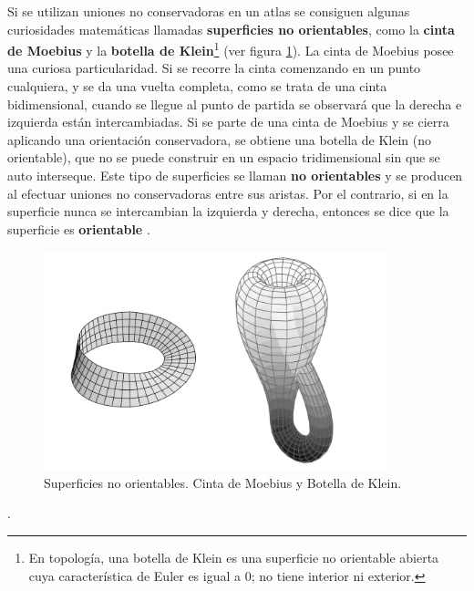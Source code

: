 \vspace{5mm}
Si se utilizan uniones no conservadoras en un atlas se consiguen algunas curiosidades matemáticas llamadas \textbf{superficies no orientables}, como la \textbf{cinta de Moebius} y la \textbf{botella de Klein}\footnote{En topología, una botella de Klein es una superficie no orientable abierta cuya característica de Euler es igual a $0$; no tiene interior ni exterior.} (ver figura \ref{fig:atlas2}). La cinta de Moebius posee una curiosa particularidad. Si se recorre la cinta comenzando en un punto cualquiera, y se da una vuelta completa, como se trata de una cinta bidimensional, cuando se llegue al punto de partida se observará que la derecha e izquierda están intercambiadas. 
Si se parte de una cinta de Moebius y se cierra aplicando una orientación conservadora, se obtiene una botella de Klein (no orientable), que no se puede construir en un espacio tridimensional sin que se auto interseque.
Este tipo de superficies se llaman \textbf{no orientables} y se producen al efectuar uniones no conservadoras entre sus aristas. Por el contrario, si en la superficie nunca se intercambian la izquierda y derecha, entonces se dice que la superficie es \textbf{orientable} \citep{Ramos2011}.

\begin{figure}[h]
\includegraphics[width=10cm]{Img/GEO/geo-mobius.jpg}
\centering
\caption{\footnotesize{Superficies no orientables. Cinta de Moebius y Botella de Klein.}}
\label{fig:atlas2}
\end{figure}

 \citep{Ramos2011}.\newline



